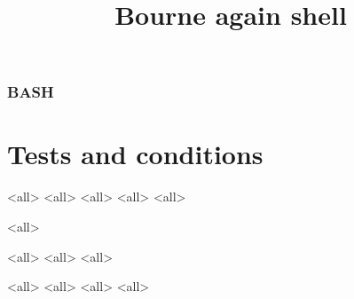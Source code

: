 
\title[bash]{Bourne again shell}




\begin{frame}
	\frametitle{BASH}
	\titlepage
	\vspace{-0.5cm}
	\begin{center}
	\end{center}
\end{frame}

\begin{frame}
	\tableofcontents
\end{frame}





\section{Tests and conditions}
\mode<all>{}
\mode<all>{}
\mode<all>{}
\mode<all>{}
\mode<all>{}

\mode<all>{}


\mode<all>{}
\mode<all>{}
\mode<all>{}

\mode<all>{}
\mode<all>{}
\mode<all>{}
\mode<all>{}


